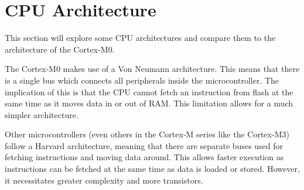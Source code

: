 \section{CPU Architecture}
This section will explore some CPU architectures and compare them to the architecture of the Cortex-M0.

The Cortex-M0 makes use of a Von Neumann architecture. This means that there is a single bus which connects all peripherals inside the microcontroller. The implication of this is that the CPU cannot fetch an instruction from flash at the same time as it moves data in or out of RAM. This limitation allows for a much simpler architecture.

Other microcontrollers (even others in the Cortex-M series like the Cortex-M3) follow a Harvard architecture, meaning that there are separate buses used for fetching instructions and moving data around. This allows faster execution as instructions can be fetched at the same time as data is loaded or stored. However, it necessitates greater complexity and more transistors. 

